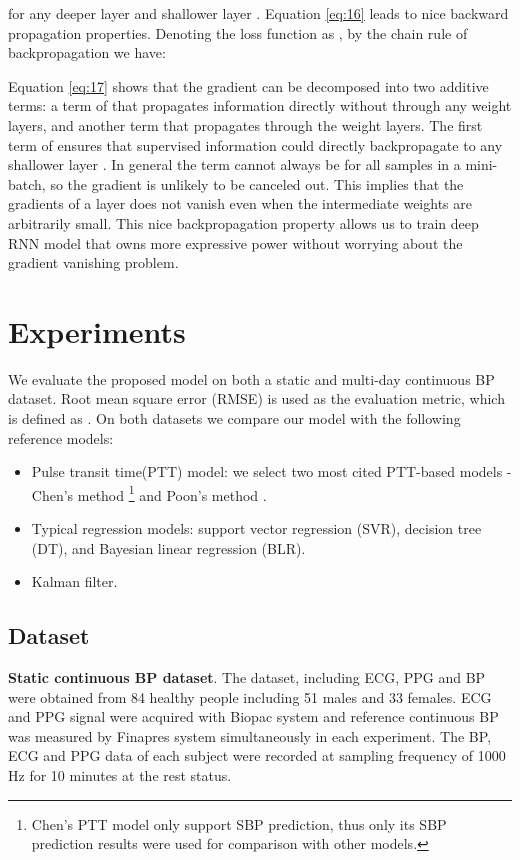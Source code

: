 \documentclass[letterpaper, 10 pt, conference]{ieeeconf}
\begin{document}
for any deeper layer  and shallower layer  .
Equation \ref{eq:16} leads to nice backward propagation properties.
Denoting the loss function as , by the chain rule of backpropagation we have:


Equation \ref{eq:17} shows that the gradient  can be decomposed into two additive terms: a term of  that propagates information directly without through any weight layers, and another term  that propagates through the weight layers.
The first term of    ensures that supervised information could directly backpropagate to any shallower layer .
In general the term  cannot always be  for all samples in a mini-batch, so the gradient  is unlikely to be canceled out.
This implies that the gradients of a layer does not vanish even when the intermediate weights are arbitrarily small.
This nice backpropagation property allows us to train deep RNN model that owns more expressive power without worrying about the gradient vanishing problem.


\section{Experiments}
We evaluate the proposed model on both a static and multi-day continuous BP dataset.
Root mean square error (RMSE) is used as the evaluation metric, which is defined as .
On both datasets we compare our model with the following reference models:
\begin{itemize}
\item
Pulse transit time(PTT) model: we select two most cited PTT-based models - Chen's method \cite{chen2000continuous} \footnote{Chen's PTT model only support SBP prediction, thus only its SBP prediction results were used for comparison with other models.} and Poon's method \cite{poon2006cuff}. 
\item
Typical regression models: support vector regression (SVR), decision tree (DT), and Bayesian linear regression (BLR).
\item
Kalman filter.
\end{itemize}
\subsection{Dataset}
\textbf{Static continuous BP dataset}.
The dataset, including ECG, PPG and BP were obtained from 84 healthy people including
51 males and 33 females.
ECG and PPG signal were acquired with Biopac system and reference continuous BP was measured by Finapres system simultaneously in each experiment.
The BP, ECG and PPG data of each subject were recorded at sampling frequency of 1000 Hz for 10 minutes at the rest status.
\end{document}
